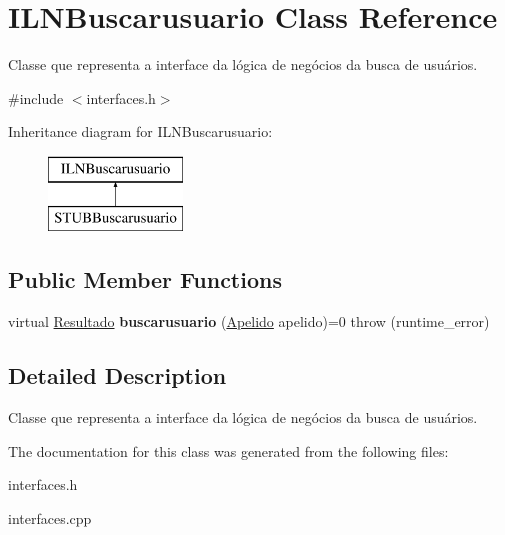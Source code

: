 \hypertarget{classILNBuscarusuario}{}\section{I\+L\+N\+Buscarusuario Class Reference}
\label{classILNBuscarusuario}


Classe que representa a interface da lógica de negócios da busca de usuários.  




{\ttfamily \#include $<$interfaces.\+h$>$}

Inheritance diagram for I\+L\+N\+Buscarusuario\+:\begin{figure}[H]
\begin{center}
\leavevmode
\includegraphics[height=2.000000cm]{classILNBuscarusuario}
\end{center}
\end{figure}
\subsection*{Public Member Functions}
\begin{DoxyCompactItemize}
\item 
\mbox{\label{classILNBuscarusuario_a7880b61bd4b9d07a35609bd66c5238a2}} 
virtual \hyperlink{classResultado}{Resultado} {\bfseries buscarusuario} (\hyperlink{classApelido}{Apelido} apelido)=0  throw (runtime\+\_\+error)
\end{DoxyCompactItemize}


\subsection{Detailed Description}
Classe que representa a interface da lógica de negócios da busca de usuários. 

The documentation for this class was generated from the following files\+:\begin{DoxyCompactItemize}
\item 
interfaces.\+h\item 
interfaces.\+cpp\end{DoxyCompactItemize}
